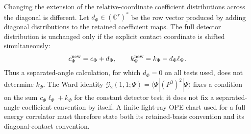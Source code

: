 Changing the extension of the relative-coordinate coefficient distributions
across the diagonal is different.  Let \(d_\Phi\in(\mathbb C^r)^\ast\) be the
row vector produced by adding diagonal distributions to the retained
coefficient maps.  The full detector distribution is unchanged only if the
explicit contact coordinate is shifted simultaneously:
\begin{equation}
  c_\Phi^{\rm new}=c_\Phi+d_\Phi,
  \qquad
  k_\Phi^{\rm new}=k_\Phi-d_\Phi\ell_\Psi .
  \label{eq:cft-light-ray-chart-contact-reshuffle}
\end{equation}
Thus a separated-angle calculation, for which \(d_\Phi=0\) on all tests used,
does not determine \(k_\Phi\).  The Ward identity
\(\mathcal G_2(1,1;\Psi)=\langle\Psi|(P^0)^2|\Psi\rangle\) fixes a condition
on the sum \(c_\Phi\ell_\Psi+k_\Phi\) for the constant detector test; it does
not fix a separated-angle coefficient convention by itself.  A finite
light-ray OPE chart used for a full energy correlator must therefore state
both its retained-basis convention and its diagonal-contact convention.

